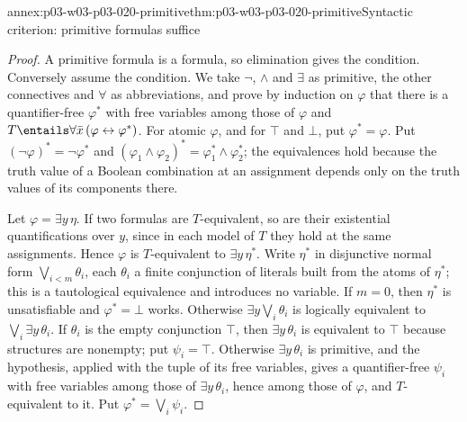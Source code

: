 \begin{annexitem}{annex:p03-w03-p03-020-primitive}{thm:p03-w03-p03-020-primitive}{Syntactic criterion: primitive formulas suffice}
\begin{proof}
A primitive formula is a formula, so elimination gives the condition.
Conversely assume the condition. We take \(\neg\), \(\land\) and \(\exists\)
as primitive, the other connectives and \(\forall\) as abbreviations, and
prove by induction on \(\varphi\) that there is a quantifier-free
\(\varphi^*\) with free variables among those of \(\varphi\) and
\(T\entails\forall\bar x\,(\varphi\leftrightarrow\varphi^*)\).
For atomic \(\varphi\), and for \(\top\) and \(\bot\), put
\(\varphi^*=\varphi\). Put \((\neg\varphi)^*=\neg\varphi^*\) and
\((\varphi_1\land\varphi_2)^*=\varphi_1^*\land\varphi_2^*\); the
equivalences hold because the truth value of a Boolean combination at an
assignment depends only on the truth values of its components there.

Let \(\varphi=\exists y\,\eta\). If two formulas are \(T\)-equivalent, so
are their existential quantifications over \(y\), since in each model of
\(T\) they hold at the same assignments. Hence \(\varphi\) is
\(T\)-equivalent to \(\exists y\,\eta^*\). Write \(\eta^*\) in disjunctive
normal form \(\bigvee_{i<m}\theta_i\), each \(\theta_i\) a finite
conjunction of literals built from the atoms of \(\eta^*\); this is a
tautological equivalence and introduces no variable. If \(m=0\), then
\(\eta^*\) is unsatisfiable and \(\varphi^*=\bot\) works. Otherwise
\(\exists y\bigvee_i\theta_i\) is logically equivalent to
\(\bigvee_i\exists y\,\theta_i\). If \(\theta_i\) is the empty conjunction
\(\top\), then \(\exists y\,\theta_i\) is equivalent to \(\top\) because
structures are nonempty; put \(\psi_i=\top\). Otherwise
\(\exists y\,\theta_i\) is primitive, and the hypothesis, applied with the
tuple of its free variables, gives a quantifier-free \(\psi_i\) with free
variables among those of \(\exists y\,\theta_i\), hence among those of
\(\varphi\), and \(T\)-equivalent to it. Put
\(\varphi^*=\bigvee_i\psi_i\).
\end{proof}
\end{annexitem}

